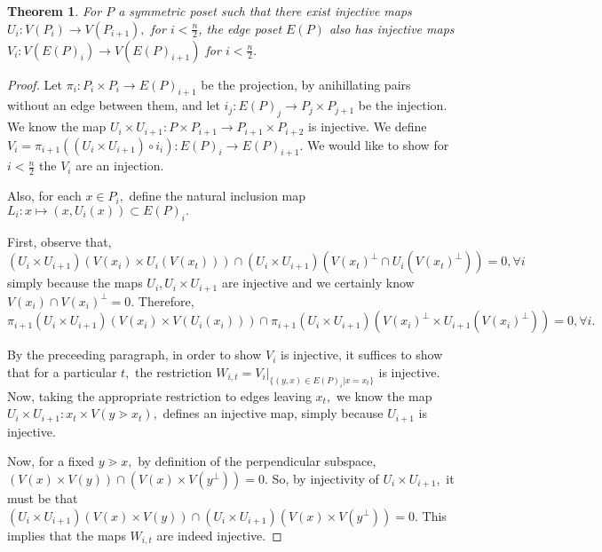 \documentclass{amsart}
\newtheorem{thm}[subsubsection]{Theorem}
\begin{document}
\begin{thm}
\label{injective_edge_maps}
For $P$ a symmetric poset such that there exist injective maps $U_i:V(P_i) \rightarrow V(P_{i+1}),$ for $i < \frac{n}{2}$,	the edge poset $E(P)$ also has injective maps $V_i:V(E(P)_i)\rightarrow V(E(P)_{i+1})$ for $i < \frac{n}{2}.$
\end{thm}
\begin{proof}
Let $\pi_i : P_{i} \times P_{i} \rightarrow E(P)_{i+1}$ be the projection, by anihillating pairs without an edge between them, and let $i_j:E(P)_j \rightarrow P_j \times P_{j+1}$ be the injection. We know the map $U_i \times U_{i+1} :P \times P_{i+1} \rightarrow P_{i+1} \times P_{i+2}$ is injective. We define $V_i = \pi_{i+1}((U_i \times U_{i+1}) \circ i_i):E(P)_i \rightarrow E(P)_{i+1}.$ We would like to show for $i < \frac{n}{2}$ the $V_i$ are an injection.

Also, for each $x \in P_i,$ define the natural inclusion map $L_i:x \mapsto (x,U_i(x)) \subset E(P)_i.$

First, observe that, $(U_i \times U_{i+1})(V(x_i) \times U_i(V(x_t))) \cap (U_i\times U_{i+1})(V(x_t)^\perp \cap U_i(V(x_t)^\perp)) = 0,\forall i$ simply because the maps $U_i, U_i \times U_{i+1}$ are injective and we certainly know $V(x_i) \cap V(x_i)^\perp = 0.$ Therefore, $\pi_{i+1}(U_i \times U_{i+1})(V(x_i) \times V(U_i(x_i))) \cap \pi_{i+1}(U_i\times U_{i+1})(V(x_i)^\perp \times U_{i+1}(V(x_i)^\perp)) = 0,\forall i.$

By the preceeding paragraph, in order to show $V_i$ is injective, it suffices to show that for a particular $t,$ the restriction $W_{i,t} = V_i|_{\{(y,x) \in E(P)_i|x = x_t\}}$ is injective. Now, taking the appropriate restriction to edges leaving $x_t,$ we know the map $U_i \times U_{i+1}:x_t \times V(y \gtrdot x_t),$ defines an injective map, simply because $U_{i+1}$ is injective.

Now, for a fixed $y \gtrdot x,$ by definition of the perpendicular subspace, $(V(x)\times V(y)) \cap (V(x) \times V(y^\perp)) = 0.$ So, by injectivity of $U_i \times U_{i+1},$ it must be that $(U_i \times U_{i+1})(V(x)\times V(y)) \cap (U_i \times U_{i+1})(V(x) \times V(y^\perp)) = 0.$ This implies that the maps $W_{i,t}$ are indeed injective.

\end{proof}
\end{document}
